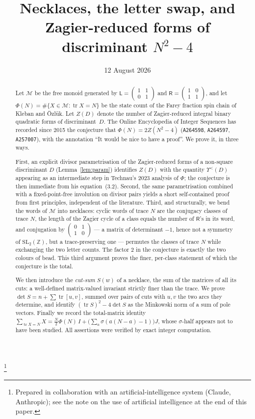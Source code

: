 \documentclass[11pt,reqno]{amsart}
\theoremstyle{plain}
\theoremstyle{definition}
\newcommand{\Z}{\mathbb{Z}}
\newcommand{\Ll}{\mathsf{L}}
\newcommand{\Rr}{\mathsf{R}}
\newcommand{\Mon}{\mathcal{M}}
\newcommand{\tr}{\operatorname{tr}}
\newcommand{\SL}{\mathrm{SL}}
\newcommand{\sqm}[4]{\left(\begin{smallmatrix}#1&#2\\#3&#4\end{smallmatrix}\right)}
\begin{document}
\title[Necklaces and Zagier-reduced forms]
      {Necklaces, the letter swap, and Zagier-reduced forms of discriminant $N^2-4$}

\author{}
\date{12 August 2026}
\thanks{Prepared in collaboration with an artificial-intelligence system (Claude, Anthropic);
see the note on the use of artificial intelligence at the end of this paper.}

\begin{abstract}
Let $\Mon$ be the free monoid generated by
$\Ll=\sqm{1}{1}{0}{1}$ and $\Rr=\sqm{1}{0}{1}{1}$, and let
$\Phi(N)=\#\{X\in\Mon:\tr X=N\}$ be the state count of the Farey fraction spin chain of
Kleban and \"Ozl\"uk. Let $Z(D)$ denote the number of Zagier-reduced integral binary
quadratic forms of discriminant~$D$. The Online Encyclopedia of Integer Sequences has
recorded since 2015 the conjecture that $\Phi(N)=2Z(N^2-4)$
(\texttt{A264598}, \texttt{A264597}, \texttt{A257007}), with the annotation
``It would be nice to have a proof''. We prove it, in three ways.

First, an explicit divisor parametrisation of the Zagier-reduced forms of a non-square
discriminant $D$ (Lemma~\ref{lem:param}) identifies $Z(D)$ with the quantity
$\Upsilon^{<}(D)$ appearing as an intermediate step in Technau's 2023 analysis of
$\Phi$; the conjecture is then immediate from his equation~(3.2). Second, the same
parametrisation combined with a fixed-point-free involution on divisor pairs yields a
short self-contained proof from first principles, independent of the literature. Third,
and structurally, we bend the words of $\Mon$ into necklaces: cyclic words of trace $N$
are the conjugacy classes of trace $N$, the length of the Zagier cycle of a class equals
the number of $\Rr$'s in its word, and conjugation by $\sqm{0}{1}{1}{0}$ --- a matrix of
determinant $-1$, hence not a symmetry of $\SL_2(\Z)$, but a trace-preserving one ---
permutes the classes of trace $N$ while exchanging the two letter counts. The factor $2$
in the conjecture is exactly the two colours of bead. This third argument proves the
finer, per-class statement of which the conjecture is the total.

We then introduce the \emph{cut-sum} $S(w)$ of a necklace, the sum of the matrices of all
its cuts: a well-defined matrix-valued invariant strictly finer than the trace. We prove
$\det S=n+\sum \tr[u,v]$, summed over pairs of cuts with $u,v$ the two arcs they
determine, and identify $(\tr S)^2-4\det S$ as the Minkowski norm of a sum of pole
vectors. Finally we record the total-matrix identity
$\sum_{\tr X=N}X=\tfrac{N}{2}\Phi(N)\,I+\bigl(\sum_{a}\sigma(a(N-a)-1)\bigr)J$, whose
$\sigma$-half appears not to have been studied. All assertions were verified by exact
integer computation.
\end{abstract}
\end{document}
